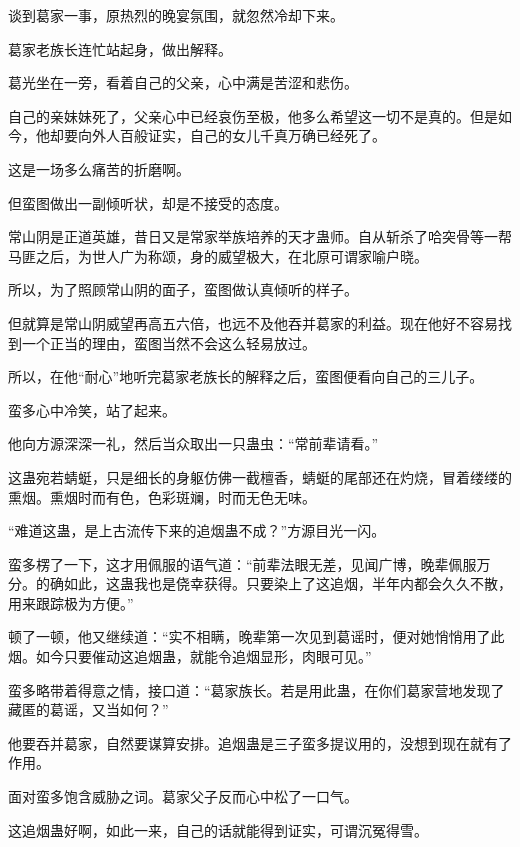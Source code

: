 
\begin{this_body}

谈到葛家一事，原热烈的晚宴氛围，就忽然冷却下来。

葛家老族长连忙站起身，做出解释。

葛光坐在一旁，看着自己的父亲，心中满是苦涩和悲伤。

自己的亲妹妹死了，父亲心中已经哀伤至极，他多么希望这一切不是真的。但是如今，他却要向外人百般证实，自己的女儿千真万确已经死了。

这是一场多么痛苦的折磨啊。

但蛮图做出一副倾听状，却是不接受的态度。

常山阴是正道英雄，昔日又是常家举族培养的天才蛊师。自从斩杀了哈突骨等一帮马匪之后，为世人广为称颂，身的威望极大，在北原可谓家喻户晓。

所以，为了照顾常山阴的面子，蛮图做认真倾听的样子。

但就算是常山阴威望再高五六倍，也远不及他吞并葛家的利益。现在他好不容易找到一个正当的理由，蛮图当然不会这么轻易放过。

所以，在他“耐心”地听完葛家老族长的解释之后，蛮图便看向自己的三儿子。

蛮多心中冷笑，站了起来。

他向方源深深一礼，然后当众取出一只蛊虫：“常前辈请看。”

这蛊宛若蜻蜓，只是细长的身躯仿佛一截檀香，蜻蜓的尾部还在灼烧，冒着缕缕的熏烟。熏烟时而有色，色彩斑斓，时而无色无味。

“难道这蛊，是上古流传下来的追烟蛊不成？”方源目光一闪。

蛮多楞了一下，这才用佩服的语气道：“前辈法眼无差，见闻广博，晚辈佩服万分。的确如此，这蛊我也是侥幸获得。只要染上了这追烟，半年内都会久久不散，用来跟踪极为方便。”

顿了一顿，他又继续道：“实不相瞒，晚辈第一次见到葛谣时，便对她悄悄用了此烟。如今只要催动这追烟蛊，就能令追烟显形，肉眼可见。”

蛮多略带着得意之情，接口道：“葛家族长。若是用此蛊，在你们葛家营地发现了藏匿的葛谣，又当如何？”

他要吞并葛家，自然要谋算安排。追烟蛊是三子蛮多提议用的，没想到现在就有了作用。

面对蛮多饱含威胁之词。葛家父子反而心中松了一口气。

这追烟蛊好啊，如此一来，自己的话就能得到证实，可谓沉冤得雪。


\end{this_body}
